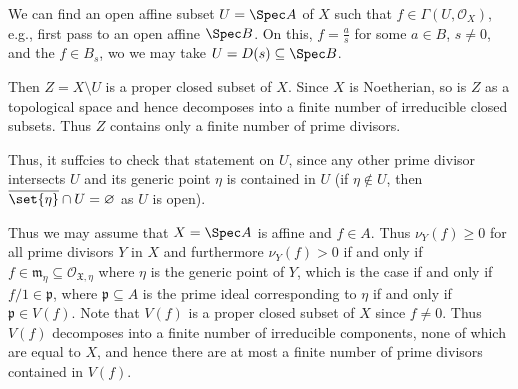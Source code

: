 We can find an open affine subset $U = \Spec A$ of $X$ such that $f \in \Gamma(U, \mathcal{O}_X)$,
e.g., first pass to an open affine $\Spec B$. On this, $f = \frac{a}{s}$ for some $a \in B$, $s\neq 0$,
and the $f \in B_s$, wo we may take $U = D(s) \subseteq \Spec B$.

Then $Z = X\setminus U$ is a proper closed subset of $X$. Since $X$ is Noetherian, so
is $Z$ as a topological space and hence decomposes into a finite number of irreducible
closed subsets. Thus $Z$ contains only a finite number of prime divisors.

Thus, it suffcies to check that statement on $U$, since any other prime divisor
intersects $U$ and its generic point $\eta$ is contained in $U$ (if $\eta \notin U$,
then $\overline{\set{\eta}} \cap U = \varnothing$ as $U$ is open).

Thus we may assume that $X = \Spec A$ is affine and $f \in A$. Thus $\nu_Y(f)\geq 0$ for
all prime divisors $Y$ in $X$ and furthermore $\nu_Y(f) > 0$ if and only if
$f \in \mathfrak{m_{\eta} \subseteq\mathcal{O}_{X, \eta}}$ where $\eta$ is the
generic point of $Y$, which is the case if and only if $f/1 \in \mathfrak{p}$, where
$\mathfrak{p} \subseteq A$ is the prime ideal corresponding to $\eta$ if and only
if $\mathfrak{p} \in V(f)$. Note that $V(f)$ is a proper closed subset of $X$ since
$f\neq 0$. Thus $V(f)$ decomposes into a finite number of irreducible components,
none of which are equal to $X$, and hence there are at most a finite number of
prime divisors contained in $V(f)$.
